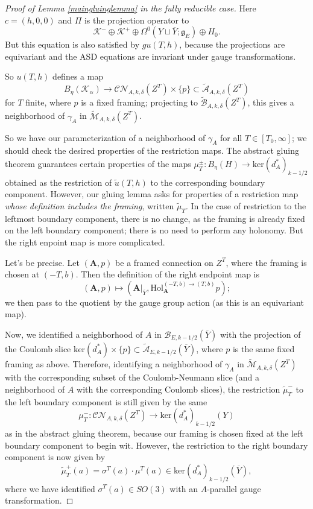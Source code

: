 \documentclass[10pt,a4paper]{amsart}
\theoremstyle{definition}
\theoremstyle{remark}
\numberwithin{figure}{qchap}
\begin{document}
\begin{proof}[Proof of Lemma \ref{maingluinglemma} in the fully reducible case]
Here $c = (h, 0, 0)$ and $\Pi$ is the projection operator to 
$$\mathcal K^- \oplus \mathcal K^+ \oplus \Omega^0(Y \sqcup \overline{Y};\mathfrak g_E) \oplus H_0.$$ 
But this equation is also satisfied by $gu(T, h)$, because the projections are equivariant and the ASD equations are invariant under gauge transformations.

So $u(T,h)$ defines a map $$B_\eta(\mathcal K_\alpha) \to \mathcal{CN}_{A,k,\delta}(Z^T) \times \{p\} \subset \widetilde{\mathcal A}_{A,k,\delta}(Z^T)$$ for $T$ finite, where $p$ is a fixed framing; projecting to $\widetilde{\mathcal B}_{A,k,\delta}(Z^T)$, this gives a neighborhood of $\gamma_A$ in $\widetilde{\mathcal M}_{A,k,\delta}(Z^T)$.

So we have our parameterization of a neighborhood of $\gamma_A$ for all $T \in [T_0, \infty]$; we should check the desired properties of the restriction maps. The abstract gluing theorem guarantees certain properties of the maps $\mu^\pm_T: B_\eta(H) \to \text{ker}(d_A^*)_{k-1/2}$ obtained as the restriction of $\widetilde u(T, h)$ to the corresponding boundary component. However, our gluing lemma asks for properties of a restriction map \emph{whose definition includes the framing}, written $\widetilde \mu_T$. In the case of restriction to the leftmost boundary component, there is no change, as the framing is already fixed on the left boundary component; there is no need to perform any holonomy. But the right enpoint map is more complicated.

Let's be precise. Let $(\mathbf{A},p)$ be a framed connection on $Z^T$, where the framing is chosen at $(-T, b)$. Then the definition of the right endpoint map is $$(\mathbf{A},p) \mapsto \left(\mathbf{A}\big|_{\overline Y}, \text{Hol}^{(-T,b) \to (T,b)}_{\mathbf{A}} p\right);$$ we then pass to the quotient by the gauge group action (as this is an equivariant map).

Now, we identified a neighborhood of $A$ in $\mathcal B_{E,k-1/2}(\overline Y)$ with the projection of the Coulomb slice $\text{ker}(d_A^*) \times \{p\} \subset \widetilde{\mathcal A}_{E,k-1/2}(\overline Y)$, where $p$ is the same fixed framing as above. Therefore, identifying a neighborhood of $\gamma_A$ in $\widetilde{\mathcal M}_{A,k,\delta}(Z^T)$ with the corresponding subset of the Coulomb-Neumann slice (and a neighborhood of $A$ with the corresponding Coulomb slices), the restriction $\widetilde{\mu}_T^-$ to the left boundary component is still given by the same 
$$\mu_T^-: \mathcal{CN}_{A,k,\delta}(Z^T) \to \text{ker}(d_A^*)_{k-1/2}(Y)$$ 
as in the abstract gluing theorem, because our framing is chosen fixed at the left boundary component to begin wit. However, the restriction to the right boundary component is now given by 
$$\widetilde{\mu}_T^+(a) = \sigma^T(a) \cdot \mu^T(a) \in \text{ker}(d^*_A)_{k-1/2}(\overline Y),$$ 
where we have identified $\sigma^T(a) \in SO(3)$ with an $A$-parallel gauge transformation.


\end{proof}
\end{document}
